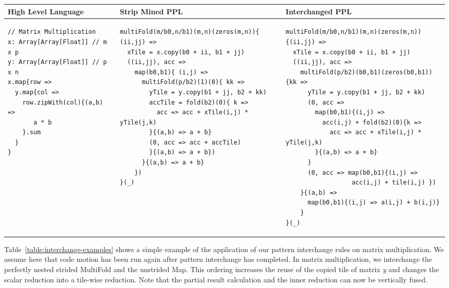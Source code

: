 \documentclass[pageno]{jpaper}
\begin{document}
\begin{table*}[t]
\centering\small
\begin{tabular}{@{}lll@{}}
\toprule
{\bf High Level Language}                            & {\bf Strip Mined PPL }       & {\bf Interchanged PPL} \\ \midrule
{\begin{lstlisting}[numbers=none]
// Matrix Multiplication
x: Array[Array[Float]] // m x p
y: Array[Array[Float]] // p x n
x.map{row =>
  y.map{col =>
    row.zipWith(col){(a,b) =>
       a * b
    }.sum
  }
}
\end{lstlisting}}
&
{\begin{lstlisting}[numbers=none]
multiFold(m/b0,n/b1)(m,n)(zeros(m,n)){ (ii,jj) =>
  xTile = x.copy(b0 + ii, b1 + jj)
  ((ii,jj), acc =>
    map(b0,b1){ (i,j) =>
      multiFold(p/b2)(1)(0){ kk =>
        yTile = y.copy(b1 + jj, b2 + kk)
        accTile = fold(b2)(0){ k =>
          acc => acc + xTile(i,j) * yTile(j,k)
        }{(a,b) => a + b}
        (0, acc => acc + accTile)
        }{(a,b) => a + b})
      }{(a,b) => a + b}
    })
}(_)
\end{lstlisting}}
&
{\begin{lstlisting}[numbers=none]
multiFold(m/b0,n/b1)(m,n)(zeros(m,n)){(ii,jj) =>
  xTile = x.copy(b0 + ii, b1 + jj)
  ((ii,jj), acc =>
    multiFold(p/b2)(b0,b1)(zeros(b0,b1)){kk =>
      yTile = y.copy(b1 + jj, b2 + kk)
      (0, acc =>
        map(b0,b1){(i,j) =>
          acc(i,j) + fold(b2)(0){k =>
            acc => acc + xTile(i,j) * yTile(j,k)
        }{(a,b) => a + b}
      }
      (0, acc => map(b0,b1){(i,j) =>
                  acc(i,j) + tile(i,j) })
    }{(a,b) =>
      map(b0,b1){(i,j) => a(i,j) + b(i,j)}
    }
}(_)
\end{lstlisting}} \\ \bottomrule
\end{tabular}
\caption{Example of the pattern interchange transformation applied to matrix multiplication.}
\label{table:interchange-examples}
\end{table*}

Table~\ref{table:interchange-examples} shows a simple example of the application of our pattern interchange rules on matrix multiplication.
We assume here that code motion has been run again after pattern interchange has completed.
In matrix multiplication, we interchange the perfectly nested strided MultiFold and the unstrided Map.
This ordering increases the reuse of the copied tile of matrix \emph{y} and changes the scalar reduction into a tile-wise reduction.
Note that the partial result calculation and the inner reduction can now be vertically fused.
\end{document}
